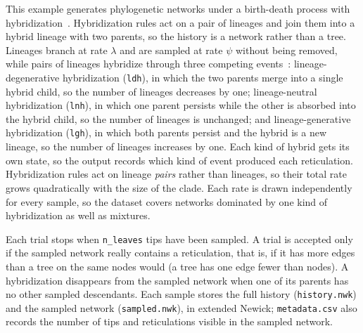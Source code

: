\documentclass[11pt]{article}
\begin{document}
This example generates phylogenetic networks under a birth-death process with
hybridization~\citep{zhang2018speciesnetwork, justison2023siphynetwork}.
Hybridization rules act on a pair of lineages and join them into a hybrid
lineage with two parents, so the history is a network rather than a tree.
Lineages branch at rate $\lambda$ and are sampled at rate $\psi$ without being
removed, while pairs of lineages hybridize through three competing
events~\citep{justison2024exploring}: lineage-degenerative hybridization
(\texttt{ldh}), in which the two parents merge into a single hybrid child, so
the number of lineages decreases by one; lineage-neutral hybridization
(\texttt{lnh}), in which one parent persists while the other is absorbed into
the hybrid child, so the number of lineages is unchanged; and lineage-generative
hybridization (\texttt{lgh}), in which both parents persist and the hybrid is a
new lineage, so the number of lineages increases by one. Each kind of hybrid
gets its own state, so the output records which kind of event produced each
reticulation. Hybridization rules act on lineage \emph{pairs} rather than
lineages, so their total rate grows quadratically with the size of the clade.
Each rate is drawn independently for every sample, so the dataset covers
networks dominated by one kind of hybridization as well as mixtures.

Each trial stops when \texttt{n\_leaves} tips have been sampled. A trial is
accepted only if the sampled network really contains a reticulation, that is, if
it has more edges than a tree on the same nodes would (a tree has one edge fewer
than nodes). A hybridization disappears from the sampled network when one of its
parents has no other sampled descendants. Each sample stores the full history
(\texttt{history.nwk}) and the sampled network (\texttt{sampled.nwk}), in
extended Newick; \texttt{metadata.csv} also records the number of tips and
reticulations visible in the sampled network.
\end{document}
